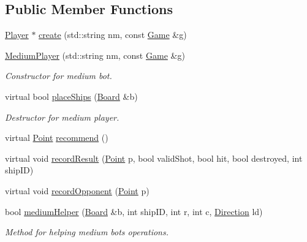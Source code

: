 \subsection*{Public Member Functions}
\begin{DoxyCompactItemize}
\item 
\mbox{\hyperlink{class_player}{Player}} $\ast$ \mbox{\hyperlink{class_medium_player_a6a51f6bab42f57e8af235f2ab196d74e}{create}} (std\+::string nm, const \mbox{\hyperlink{class_game}{Game}} \&g)
\item 
\mbox{\label{class_medium_player_a76923857c4fa54d192ed4644c72bce2d}} 
\mbox{\hyperlink{class_medium_player_a76923857c4fa54d192ed4644c72bce2d}{Medium\+Player}} (std\+::string nm, const \mbox{\hyperlink{class_game}{Game}} \&g)
\begin{DoxyCompactList}\small\item\em Constructor for medium bot. \end{DoxyCompactList}\item 
virtual bool \mbox{\hyperlink{class_medium_player_ac4d4748e2c27a2a51033bbce9f12de26}{place\+Ships}} (\mbox{\hyperlink{class_board}{Board}} \&b)
\begin{DoxyCompactList}\small\item\em Destructor for medium player. \end{DoxyCompactList}\item 
virtual \mbox{\hyperlink{class_point}{Point}} \mbox{\hyperlink{class_medium_player_a2e99d57f30f3f7f929840b8cda16527d}{recommend}} ()
\item 
virtual void \mbox{\hyperlink{class_medium_player_aeadd8498cba5c447afbb5a0eb7408285}{record\+Result}} (\mbox{\hyperlink{class_point}{Point}} p, bool valid\+Shot, bool hit, bool destroyed, int ship\+ID)
\item 
virtual void \mbox{\hyperlink{class_medium_player_a6183d4a8fe3d68419afcfa9e33cd5928}{record\+Opponent}} (\mbox{\hyperlink{class_point}{Point}} p)
\item 
bool \mbox{\hyperlink{class_medium_player_a502c34f56cfe60def6d01de7c4f300e2}{medium\+Helper}} (\mbox{\hyperlink{class_board}{Board}} \&b, int ship\+ID, int r, int c, \mbox{\hyperlink{_globals_8h_a224b9163917ac32fc95a60d8c1eec3aa}{Direction}} ld)
\begin{DoxyCompactList}\small\item\em Method for helping medium bot\textquotesingle{}s operations. \end{DoxyCompactList}\item 

\end{DoxyCompactItemize}
